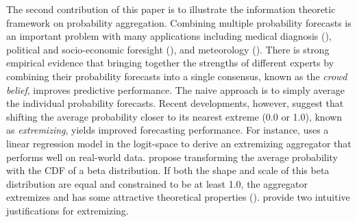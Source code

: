\documentclass[11pt,twoside]{article}
\begin{document}
The second contribution of this paper is to illustrate the information theoretic framework  on probability aggregation. Combining multiple probability forecasts is an important problem with many applications including medical diagnosis (\citet{wilson1998prediction, pepe2003statistical}), political and socio-economic foresight (\citet{tetlock2005expert}), and meteorology (\citet{sanders1963subjective, vislocky1995improved, baars2005performance}). There is strong empirical evidence that bringing together the strengths of different experts by combining their probability forecasts into a single consensus, known as the \textit{crowd belief},  improves predictive performance. The naive approach is to simply average the individual probability forecasts. Recent developments, however, suggest that shifting the average probability closer to its nearest extreme (0.0 or 1.0), known as \textit{extremizing}, yields improved forecasting performance. For instance, \citet{satopaa} uses a linear regression model in the logit-space to derive an extremizing aggregator that performs well on real-world data. \citet{Ranjan08} propose transforming the average probability with the CDF of a beta distribution. If both the shape and scale of this beta distribution are equal and constrained to be at least 1.0,  the aggregator extremizes and has some attractive theoretical properties (\cite{Wallsten2001}).  \citet{Baron} provide  two intuitive justifications for extremizing.

\end{document}
